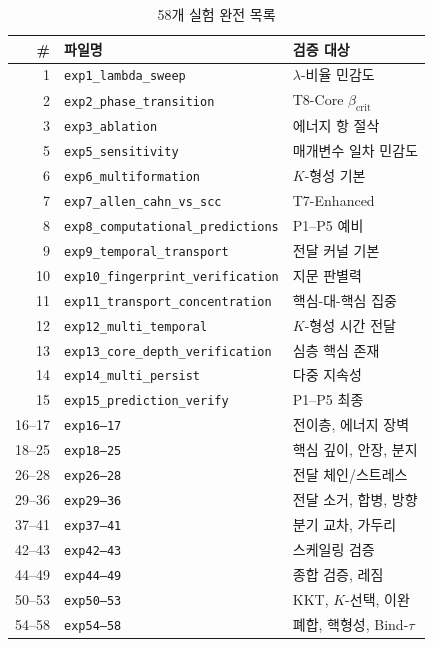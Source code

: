 \begin{table}[h]
\centering
\caption{58개 실험 완전 목록}
\label{tab:all-experiments}
\small
\begin{tabular}{rll}
\toprule
\textbf{\#} & \textbf{파일명} & \textbf{검증 대상} \\
\midrule
1 & \texttt{exp1\_lambda\_sweep} & $\lambda$-비율 민감도 \\
2 & \texttt{exp2\_phase\_transition} & T8-Core $\beta_{\mathrm{crit}}$ \\
3 & \texttt{exp3\_ablation} & 에너지 항 절삭 \\
5 & \texttt{exp5\_sensitivity} & 매개변수 일차 민감도 \\
6 & \texttt{exp6\_multiformation} & $K$-형성 기본 \\
7 & \texttt{exp7\_allen\_cahn\_vs\_scc} & T7-Enhanced \\
8 & \texttt{exp8\_computational\_predictions} & P1--P5 예비 \\
9 & \texttt{exp9\_temporal\_transport} & 전달 커널 기본 \\
10 & \texttt{exp10\_fingerprint\_verification} & 지문 판별력 \\
11 & \texttt{exp11\_transport\_concentration} & 핵심-대-핵심 집중 \\
12 & \texttt{exp12\_multi\_temporal} & $K$-형성 시간 전달 \\
13 & \texttt{exp13\_core\_depth\_verification} & 심층 핵심 존재 \\
14 & \texttt{exp14\_multi\_persist} & 다중 지속성 \\
15 & \texttt{exp15\_prediction\_verify} & P1--P5 최종 \\
16--17 & \texttt{exp16--17} & 전이층, 에너지 장벽 \\
18--25 & \texttt{exp18--25} & 핵심 깊이, 안장, 분지 \\
26--28 & \texttt{exp26--28} & 전달 체인/스트레스 \\
29--36 & \texttt{exp29--36} & 전달 소거, 합병, 방향 \\
37--41 & \texttt{exp37--41} & 분기 교차, 가두리 \\
42--43 & \texttt{exp42--43} & 스케일링 검증 \\
44--49 & \texttt{exp44--49} & 종합 검증, 레짐 \\
50--53 & \texttt{exp50--53} & KKT, $K$-선택, 이완 \\
54--58 & \texttt{exp54--58} & 폐합, 핵형성, Bind-$\tau$ \\
\bottomrule
\end{tabular}
\end{table}

